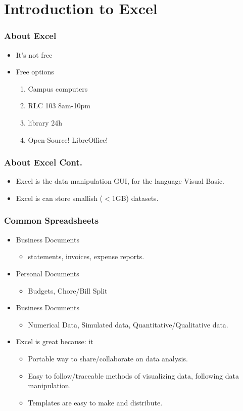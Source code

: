 \documentclass[17pt]{beamer}
\begin{document}
\section{Introduction to Excel}
\begin{frame}
	\frametitle{About Excel}
	\begin{itemize}
	\item It's not free
	\item Free options
	\begin{enumerate}
		\item Campus computers
		\item RLC 103 8am-10pm
		\item library 24h 
		\item Open-Source! LibreOffice! 
	\end{enumerate}
	\end{itemize}
\end{frame}
\begin{frame}
	\frametitle{About Excel Cont.}
	\begin{itemize}
		\item Excel is the data manipulation GUI, for the language Visual Basic.
		\item Excel is can store smallish ($<1$GB) datasets.
	\end{itemize}	
\end{frame}
\begin{frame}
	\frametitle{Common Spreadsheets}
	\begin{itemize}
		\item Business Documents
		\begin{itemize}
			\item statements, invoices, expense reports.		
		\end{itemize}
		\item Personal Documents
			\begin{itemize}
				\item Budgets, Chore/Bill Split		
			\end{itemize}
		\item Business Documents
			\begin{itemize}
				\item Numerical Data, Simulated data, Quantitative/Qualitative data.   
			\end{itemize}
	\item Excel is great because: it 
	\begin{itemize}
		\item Portable way to share/collaborate on data analysis.
		\item Easy to follow/traceable methods of visualizing data, following data manipulation.
		\item Templates are easy to make and distribute. 
	\end{itemize}
	\end{itemize}
\end{frame}
\end{document}
